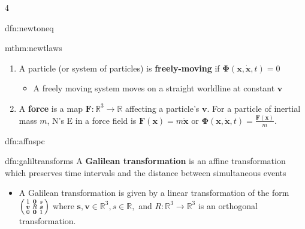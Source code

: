 \documentclass[landscape, 8pt]{extarticle}
\begin{document}
\begin{multicols*}{4}
\begin{mdfn}{dfn:newtoneq}{ }
		\end{mdfn}
		
		
		\begin{mthm}{mthm:newtlaws}{ }
			\begin{enumerate}[label=(\arabic*)]
				\item A particle (or system of particles) is \textbf{freely-moving} if $\bm{\Phi}(\bm{x}, \bm{\dot{x}}, t) = 0$
				\begin{itemize}
					\item A freely moving system moves on a straight worldline at constant $\bm{v}$
				\end{itemize}
				\item A \textbf{force} is a map $\bm{F} : \mathbb{R}^3 \to \mathbb{R}$ affecting a particle's $\bm{v}$. For a particle of inertial mass $m$, N's E in a force field is $\bm{F}(\bm{x}) = m \bm{\ddot{x}}$ or $\bm{\Phi}(\bm{x}, \bm{\dot{x}}, t) = \frac{\bm{F}(\bm{x})}{m}$.
				
			\end{enumerate}
			
		\end{mthm}
		
		
		\begin{dfn}{dfn:affnspc}{ }
			
			
		\end{dfn}
		
		
		\begin{dfn}{dfn:galiltransforms}{ }
			A \textbf{Galilean transformation} is an affine transformation which preserves time intervals and the distance between simultaneous events
			\begin{itemize}
				\item A Galilean transformation is given by a linear transformation of the form $\begin{psmallmatrix*}
					1&\bm{0}&s\\
					\bm{v}&R&\bm{s}\\
					0&\bm{0}&1
				\end{psmallmatrix*}$ where $\bm{s, v}\in \mathbb{R}^3, s\in \mathbb{R},$ and $R: \mathbb{R}^3 \to \mathbb{R}^3$ is an orthogonal transformation.
			\end{itemize}
			
		\end{dfn}
		
		
		
	\end{multicols*}
	
	
\end{document}
